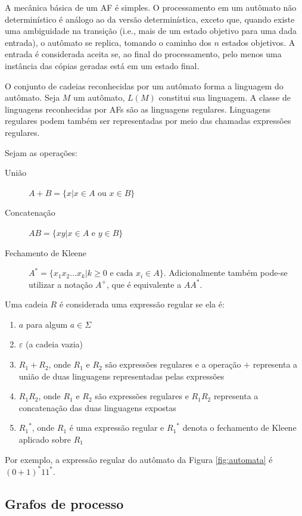 \documentclass[12pt,a4paper]{article}
\begin{document}
A mecânica básica de um AF é simples.
O processamento em um autômato não determinístico é análogo ao da versão
determinística, exceto que, quando existe uma ambiguidade na transição (i.e.,
mais de um estado objetivo para uma dada entrada), o autômato se replica, tomando
o caminho dos $n$ estados objetivos. A entrada é considerada aceita se, ao
final do processamento, pelo menos uma instância das cópias geradas está em um
estado final.

O conjunto de cadeias reconhecidas por um autômato forma a linguagem do
autômato. Seja $M$ um autômato, $L(M)$ constitui sua linguagem. A classe
de linguagens reconhecidas por AFs são as linguagens regulares.
Linguagens regulares podem também ser representadas por meio das chamadas
expressões regulares.

Sejam as operações:

\begin{description}
\item[União] $A+B=\{x | x \in A \mbox{ ou } x \in B\}$
\item[Concatenação] $AB=\{xy | x \in A \mbox{ e } y \in B\}$
\item[Fechamento de Kleene] $A^*=\{x_1x_2 \ldots x_k | k \ge 0 \mbox{ e cada } x_i \in A\}$.
Adicionalmente também pode-se utilizar a notação $A^+$, que é equivalente a $AA^*$.
\end{description}

Uma cadeia $R$ é considerada uma expressão regular 
se ela é:

\begin{enumerate}
\item $a$ para algum $a \in \Sigma$
\item $\varepsilon$ (a cadeia vazia)
\item $R_1+R_2$, onde $R_1$ e $R_2$ são expressões regulares e
a operação $+$ representa a união de duas linguagens representadas pelas expressões
\item $R_1R_2$, onde $R_1$ e $R_2$ são expressões regulares e $R_1R_2$ representa
a concatenação das duas linguagens expostas
\item ${R_1}^*$, onde $R_1$ é uma expressão regular e ${R_1}^*$ denota o fechamento
de Kleene aplicado sobre $R_1$
\end{enumerate}

Por exemplo, a expressão regular do autômato da Figura \ref{fig:automata}
é $(0+1)^*11^*$.

\subsection{Grafos de processo}
\end{document}
